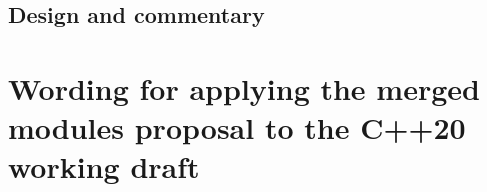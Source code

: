 \documentclass[ebook,10pt,oneside,openany,final]{memoir}
\begin{document}
\pagestyle{cpppage}



\frontmatter



\mainmatter
\setglobalstyles

\begin{KeepFromToc}
\part[Commentary]{Design and commentary}\label{commentary}



\end{KeepFromToc}

\part[Wording]{Wording for applying the merged modules proposal to the C++20 working draft}\label{wording}

%
%
%
%










%

%


\end{document}
